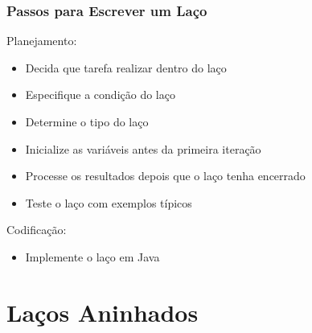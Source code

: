 \documentclass[xcolor={dvipsnames,table},aspectratio=169]{beamer}
\begin{document}
\begin{frame}\frametitle{Passos para Escrever um Laço}
Planejamento:
\begin{itemize}
	\item Decida que tarefa realizar dentro do laço
	\item Especifique a condição do laço
	\item Determine o tipo do laço
	\item Inicialize as variáveis antes da primeira iteração
	\item Processe os resultados depois que o laço tenha encerrado
	\item Teste o laço com exemplos típicos
\end{itemize}
Codificação:
\begin{itemize}
	\item Implemente o laço em Java
\end{itemize}
\end{frame}

\section{Laços Aninhados}
\end{document}
